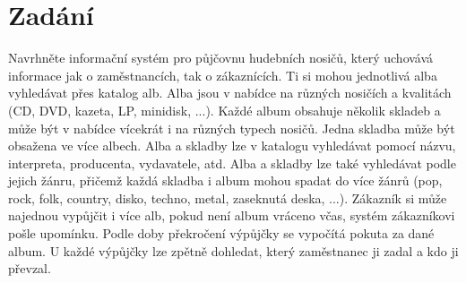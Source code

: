 \section {Zadání}

Navrhněte informační systém pro půjčovnu hudebních nosičů, který uchovává informace jak o zaměstnancích, tak o zákaznících. Ti si mohou jednotlivá alba vyhledávat přes katalog alb. Alba jsou v nabídce na různých nosičích a kvalitách (CD, DVD, kazeta, LP, minidisk, ...). Každé album obsahuje několik skladeb a může být v nabídce vícekrát i na různých typech nosičů. Jedna skladba může být obsažena ve více albech. Alba a skladby lze v katalogu vyhledávat pomocí názvu, interpreta, producenta, vydavatele, atd. Alba a skladby lze také vyhledávat podle jejich žánru, přičemž každá skladba i album mohou spadat do více žánrů (pop, rock, folk, country, disko, techno, metal, zaseknutá deska, ...). Zákazník si může najednou vypůjčit i více alb, pokud není album vráceno včas, systém zákazníkovi pošle upomínku. Podle doby překročení výpůjčky se vypočítá pokuta za dané album. U každé výpůjčky lze zpětně dohledat, který zaměstnanec ji zadal a kdo ji převzal.